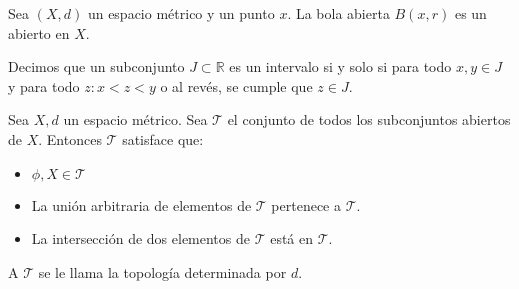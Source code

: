 \documentclass{./Topologia.tex}
\begin{document}
\begin{teorema}
	Sea $(X,d)$ un espacio métrico y un punto $x$. La bola abierta
	$B(x,r)$ es un abierto en $X$.
\end{teorema}
\begin{defin}
	Decimos que un subconjunto $J \subset \mathbb{R}$ es un intervalo
	si y solo si para todo $x,y \in J$ y para todo $z: x < z < y$ o
	al revés, se cumple que $z \in J$.
\end{defin}
Sea \(X,d\) un espacio métrico. Sea \(\mathcal{T}\) el conjunto de todos los subconjuntos
abiertos de \(X\). Entonces \(\mathcal{T}\) satisface que:

\begin{itemize}
	\item \(\phi, X \in  \mathcal{T}\)
	\item La unión arbitraria de elementos de \(\mathcal{T}\) pertenece a \(\mathcal{T}\).
	\item La intersección de dos elementos de \(\mathcal{T}\) está en \(\mathcal{T}\).
\end{itemize}
A \(\mathcal{T}\) se le llama la topología determinada por \(d\).
\end{document}
